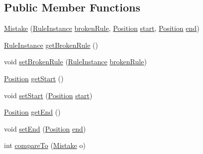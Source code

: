 \subsection*{Public Member Functions}
\begin{DoxyCompactItemize}
\item 
\hyperlink{classbr_1_1usp_1_1cata_1_1model_1_1_mistake_a7894dc26b78f15ed8d903f04482b0265}{Mistake} (\hyperlink{classbr_1_1usp_1_1cata_1_1model_1_1_rule_instance}{Rule\+Instance} \hyperlink{classbr_1_1usp_1_1cata_1_1model_1_1_mistake_a1688b622b2a1dd1fbf721d60f2068e8e}{broken\+Rule}, \hyperlink{classbr_1_1usp_1_1cata_1_1model_1_1_position}{Position} \hyperlink{classbr_1_1usp_1_1cata_1_1model_1_1_mistake_adccd7b64157ac80692f545a07ae2da56}{start}, \hyperlink{classbr_1_1usp_1_1cata_1_1model_1_1_position}{Position} \hyperlink{classbr_1_1usp_1_1cata_1_1model_1_1_mistake_ad4a5a2ff754635480d61cb36cfc7ba84}{end})
\item 
\hyperlink{classbr_1_1usp_1_1cata_1_1model_1_1_rule_instance}{Rule\+Instance} \hyperlink{classbr_1_1usp_1_1cata_1_1model_1_1_mistake_aad09ab3f3dad3c2f313e45a03708ed4b}{get\+Broken\+Rule} ()
\item 
void \hyperlink{classbr_1_1usp_1_1cata_1_1model_1_1_mistake_ac25042b89bf2c0a0964c8b1f28da34db}{set\+Broken\+Rule} (\hyperlink{classbr_1_1usp_1_1cata_1_1model_1_1_rule_instance}{Rule\+Instance} \hyperlink{classbr_1_1usp_1_1cata_1_1model_1_1_mistake_a1688b622b2a1dd1fbf721d60f2068e8e}{broken\+Rule})
\item 
\hyperlink{classbr_1_1usp_1_1cata_1_1model_1_1_position}{Position} \hyperlink{classbr_1_1usp_1_1cata_1_1model_1_1_mistake_a22bab8bc0facacbf204d0ae08529f3fd}{get\+Start} ()
\item 
void \hyperlink{classbr_1_1usp_1_1cata_1_1model_1_1_mistake_ade1240ac3e05995493a1c3b7f243f135}{set\+Start} (\hyperlink{classbr_1_1usp_1_1cata_1_1model_1_1_position}{Position} \hyperlink{classbr_1_1usp_1_1cata_1_1model_1_1_mistake_adccd7b64157ac80692f545a07ae2da56}{start})
\item 
\hyperlink{classbr_1_1usp_1_1cata_1_1model_1_1_position}{Position} \hyperlink{classbr_1_1usp_1_1cata_1_1model_1_1_mistake_a255b363abafa4b99a6a178a423a41cd4}{get\+End} ()
\item 
void \hyperlink{classbr_1_1usp_1_1cata_1_1model_1_1_mistake_a943a96582ff566f7244915cccd2ca6cf}{set\+End} (\hyperlink{classbr_1_1usp_1_1cata_1_1model_1_1_position}{Position} \hyperlink{classbr_1_1usp_1_1cata_1_1model_1_1_mistake_ad4a5a2ff754635480d61cb36cfc7ba84}{end})
\item 
int \hyperlink{classbr_1_1usp_1_1cata_1_1model_1_1_mistake_a1d02ef5237f0d87e5272c83c2aa0fd19}{compare\+To} (\hyperlink{classbr_1_1usp_1_1cata_1_1model_1_1_mistake}{Mistake} o)
\end{DoxyCompactItemize}
